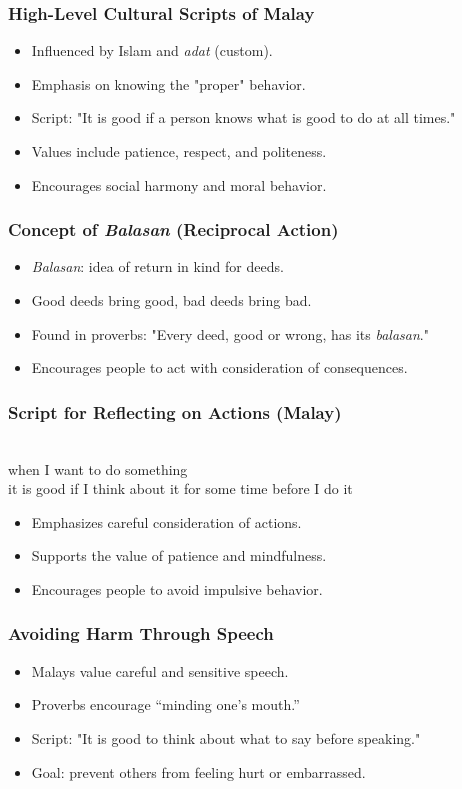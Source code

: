\documentclass[xetex]{beamer}
\begin{document}
\begin{frame}
\frametitle{High-Level Cultural Scripts of Malay}
\begin{itemize}
    \item Influenced by Islam and \textit{adat} (custom).
    \item Emphasis on knowing the "proper" behavior.
    \item Script: "It is good if a person knows what is good to do at all times."
    \item Values include patience, respect, and politeness.
    \item Encourages social harmony and moral behavior.
\end{itemize}
\end{frame}

\begin{frame}
\frametitle{Concept of \textit{Balasan} (Reciprocal Action)}
\begin{itemize}
    \item \textit{Balasan}: idea of return in kind for deeds.
    \item Good deeds bring good, bad deeds bring bad.
    \item Found in proverbs: "Every deed, good or wrong, has its \textit{balasan}."
    \item Encourages people to act with consideration of consequences.
\end{itemize}
\end{frame}

\begin{frame}
\frametitle{Script for Reflecting on Actions (Malay)}
\begin{exe}
     \\
    when I want to do something \\
    it is good if I think about it for some time before I do it
\end{exe}
\begin{itemize}
    \item Emphasizes careful consideration of actions.
    \item Supports the value of patience and mindfulness.
    \item Encourages people to avoid impulsive behavior.
\end{itemize}
\end{frame}

\begin{frame}
\frametitle{Avoiding Harm Through Speech}
\begin{itemize}
    \item Malays value careful and sensitive speech.
    \item Proverbs encourage “minding one’s mouth.”
    \item Script: "It is good to think about what to say before speaking."
    \item Goal: prevent others from feeling hurt or embarrassed.
\end{itemize}
\end{frame}
\end{document}

